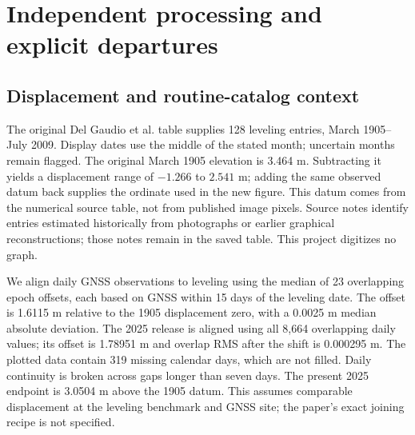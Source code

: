 \section{Independent processing and explicit departures}
\subsection*{Displacement and routine-catalog context}
The original Del Gaudio et al. table supplies 128 leveling entries, March 1905--July 2009. Display dates use the middle of the stated month; uncertain months remain flagged. The original March 1905 elevation is 3.464 m. Subtracting it yields a displacement range of $-1.266$ to $2.541$ m; adding the same observed datum back supplies the ordinate used in the new figure. This datum comes from the numerical source table, not from published image pixels. Source notes identify entries estimated historically from photographs or earlier graphical reconstructions; those notes remain in the saved table. This project digitizes no graph.

We align daily GNSS observations to leveling using the median of 23 overlapping epoch offsets, each based on GNSS within 15 days of the leveling date. The offset is 1.6115 m relative to the 1905 displacement zero, with a 0.0025 m median absolute deviation. The 2025 release is aligned using all 8,664 overlapping daily values; its offset is 1.78951 m and overlap RMS after the shift is 0.000295 m. The plotted data contain 319 missing calendar days, which are not filled. Daily continuity is broken across gaps longer than seven days. The present 2025 endpoint is 3.0504 m above the 1905 datum. This assumes comparable displacement at the leveling benchmark and GNSS site; the paper's exact joining recipe is not specified.

